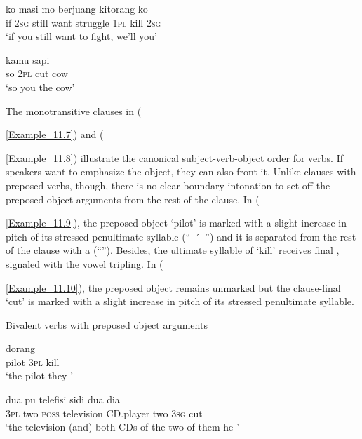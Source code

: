 {{{{{{{{{\ea
\label{Example_11.7}
 {ko} {masi} {mo} {berjuang} {kitorang} {} {ko}\\ %
 if  \textsc{2sg}  still  want  struggle  \textsc{1pl}  kill  \textsc{2sg}\\
\glt 
‘if you still want to fight, we’ll  you’ \textstyleExampleSource{[081029-004-Cv.0072]}
\z

\ea
\label{Example_11.8}
 {kamu} {} {sapi}\\ %
 so  \textsc{2pl}  cut  cow\\
\glt 
‘so you  the cow’ \textstyleExampleSource{[080925-005-CvPh.0007]}
\z


The monotransitive clauses in ({\ref{Example_11.7}) and ({\ref{Example_11.8}) illustrate the canonical subject-verb-object order for  verbs. If speakers want to emphasize the object, they can also front it. Unlike clauses with preposed  verbs, though, there is no clear boundary intonation to set-off the preposed object arguments from the rest of the clause. In ({\ref{Example_11.9}), the preposed object  ‘pilot’ is marked with a slight increase in pitch of its stressed penultimate syllable (“~\'{~}~”) and it is separated from the rest of the clause with a  (“{\textbar}”). Besides, the ultimate syllable of  ‘kill’ receives final , signaled with the vowel tripling. In ({\ref{Example_11.10}), the preposed object remains unmarked but the clause-final   ‘cut’ is marked with a slight increase in pitch of its stressed penultimate syllable.


\begin{styleExampleTitle}
Bivalent verbs with preposed object arguments
\end{styleExampleTitle}

\ea
\label{Example_11.9}
 {\textup{\textbar}} {dorang} {}\\ %
 pilot  {}  \textsc{3pl}  kill\\
\glt 
‘the pilot they ’ \textstyleExampleSource{[081025-004-Cv.0040]}
\z

\ea
\label{Example_11.10}
 {dua} {pu} {telefisi} {sidi} {dua} {dia} {}\\ %
 \textsc{3pl}  two  \textsc{poss}  television  CD.player  two  \textsc{3sg}  cut\\
\glt 
‘the television (and) both CDs of the two of them he ’ \textstyleExampleSource{[081011-009-Cv.0006]}
\z


}}}}}}}}}}}}}
